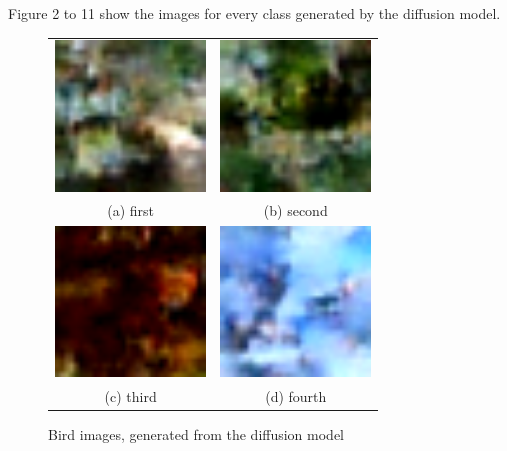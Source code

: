 \documentclass[conference]{IEEEtran}
\begin{document}
Figure 2 to 11 show the images for every class generated by the diffusion model.
\begin{figure}
  \begin{tabular}{cc}
    \includegraphics[width=40mm]{./images/generated-imgs-cosine/bird/0204.png} 
&   \includegraphics[width=40mm]{./images/generated-imgs-cosine/bird/0205.png} 
\\
  (a) first 
  & (b) second \\[6pt]
     \includegraphics[width=40mm]{./images/generated-imgs-cosine/bird/0206.png} 
  &  \includegraphics[width=40mm]{./images/generated-imgs-cosine/bird/0207.png} 
\\
  (c) third & (d) fourth \\[6pt]
  \end{tabular}
  \caption{Bird images, generated from the diffusion model}
  \end{figure}
\end{document}
